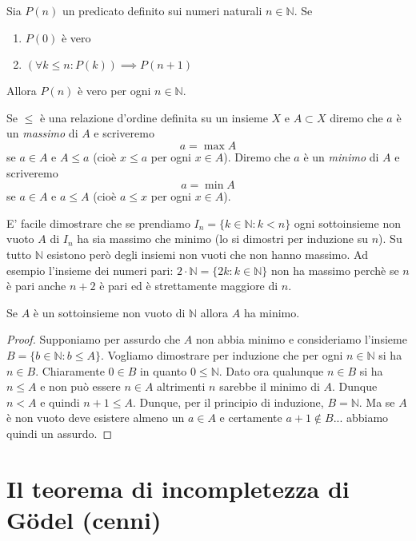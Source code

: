 \documentclass[italian,a4paper,hidelinks,headinclude]{scrartcl}
\newcommand{\NN}{{\mathbb N}}
\begin{document}
\begin{theorem}
Sia $P(n)$ un predicato definito sui numeri naturali $n\in \NN$.
Se
\begin{enumerate}
\item $P(0)$ è vero
\item $(\forall k\le n\colon P(k))\implies P(n+1)$
\end{enumerate}
Allora $P(n)$ è vero per ogni $n\in \NN$.
\end{theorem}

\begin{definition}
  Se $\le$ è una relazione d'ordine definita su un insieme $X$ e
  $A\subset X$ diremo che $a$ è un \emph{massimo} di $A$ e
  scriveremo
  \[
    a = \max A
  \]
  se $a\in A$ e $A\le a$ (cioè $x\le a$ per ogni $x\in A$).
  Diremo che $a$ è un \emph{minimo} di $A$ e scriveremo
  \[
    a = \min A
  \]
  se $a\in A$ e $a\le A$ (cioè $a\le x$ per ogni $x\in A$).
\end{definition}

E' facile dimostrare che se prendiamo $I_n = \{k\in \NN\colon k<n\}$
ogni sottoinsieme non vuoto $A$ di $I_n$ ha sia massimo che minimo
(lo si dimostri per induzione su $n$). Su tutto $\NN$ esistono
però degli insiemi non vuoti che non hanno massimo. Ad esempio l'insieme
dei numeri pari:
$2\cdot \NN = \{2k\colon k\in \NN\}$ non ha massimo perchè se $n$ è pari
anche $n+2$ è pari ed è strettamente maggiore di $n$.

\begin{theorem}[buon ordinamento di $\NN$]
Se $A$ è un sottoinsieme non vuoto di $\NN$ allora
$A$ ha minimo.
\end{theorem}
%
\begin{proof}
Supponiamo per assurdo che $A$ non abbia minimo e consideriamo l'insieme
$B=\{b\in \NN\colon b \le A\}$.
Vogliamo dimostrare per induzione che per ogni $n\in \NN$ si ha $n\in B$.
Chiaramente $0\in B$ in quanto $0\le \NN$.
Dato ora qualunque $n\in B$
si ha $n\le A$ e non può essere $n\in A$ altrimenti $n$ sarebbe il minimo di $A$.
Dunque $n < A$ e quindi $n+1 \le A$.
Dunque, per il principio di induzione, $B=\NN$. Ma se $A$ è non
vuoto deve esistere almeno un $a\in A$ e certamente $a+1\not \in B$...
abbiamo quindi un assurdo.
\end{proof}


\section{Il teorema di incompletezza di G\"odel (cenni)}
\end{document}
